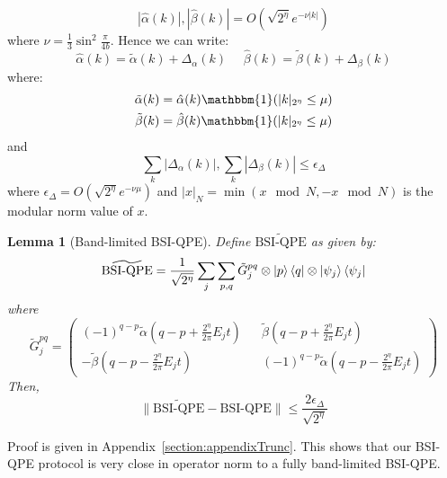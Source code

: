\documentclass[aps,floatfix,10pt,amssymb,amsfont,amsmath,superscriptaddress,float,nofootinbib,longbibliography,nobalancelastpage,twocolumn]{revtex4-2}
\newtheorem{lemma}{Lemma}
\begin{document}
\begin{equation}
    |\hat \alpha(k)|,|\hat \beta(k)| = O\left( \sqrt{2^{\eta}}e^{-\nu |k|}\right)
    \label{eq:scaling}
\end{equation}
where $\nu = \frac{1}{3}\sin^2\frac{\pi}{4b}$. Hence we can write:
\begin{equation}
    \hat\alpha(k) = \tilde\alpha(k) + \Delta_{\alpha}(k) \>\>\>\>\>\>\hat\beta(k) = \tilde\beta(k) + \Delta_{\beta}(k)
    \label{eq:decomposealpha}
\end{equation}
where:
\begin{align}
    \tilde\alpha(k) &= \hat\alpha(k)\mathbbm{1}(|k|_{2^{\eta}}\leq \mu)\\
    \tilde\beta(k) &= \hat\beta(k)\mathbbm{1}(|k|_{2^{\eta}}\leq \mu)
    \label{eq:decomposealpha2}
\end{align}  and
\begin{equation}
    \sum_k|\Delta_\alpha(k)|,\sum_k|\Delta_\beta(k)|\leq \epsilon_{\Delta}
    \label{eq:decomposealpha3}
\end{equation} where $\epsilon_{\Delta} = O(\sqrt{2^{\eta}}e^{-\nu \mu})$ and $|x|_N = \min(x \mod N,- x\mod N)$ is the modular norm value of $x$.

\begin{lemma}[Band-limited BSI-QPE]
\label{lemma:0}
    Define $\widetilde{\text{BSI-QPE}}$ as given by:
    \begin{equation}
       \widetilde{\text{BSI-QPE}}= \frac{1}{\sqrt{2^{\eta}}}\sum_j \sum_{p,q} \tilde G^{pq}_j \otimes \ket{p}\bra{q} \otimes \ket{\psi_j}\bra{\psi_j}
    \end{equation}
    where 
    \begin{equation}
        \tilde G^{pq}_j = \begin{pmatrix}
        (-1)^{q-p}\tilde\alpha(q-p+\frac{2^{\eta}}{2\pi}E_jt) && \tilde\beta(q-p+\frac{2^{\eta}}{2\pi}E_jt)\\
        -\tilde\beta (q-p-\frac{2^{\eta}}{2\pi}E_jt) && (-1)^{q-p}\tilde\alpha(q-p-\frac{2^{\eta}}{2\pi}E_jt)
    \end{pmatrix}
    \end{equation}
    Then,  
    \begin{equation}
        \|\widetilde{\text{BSI-QPE}}-\text{BSI-QPE}\| \leq \frac{2\epsilon_{\Delta}}{\sqrt{2^{\eta}}}
    \end{equation}
\end{lemma}
Proof is given in Appendix~\ref{section:appendixTrunc}. This shows that our BSI-QPE protocol is very close in operator norm to a fully band-limited BSI-QPE.
\end{document}
